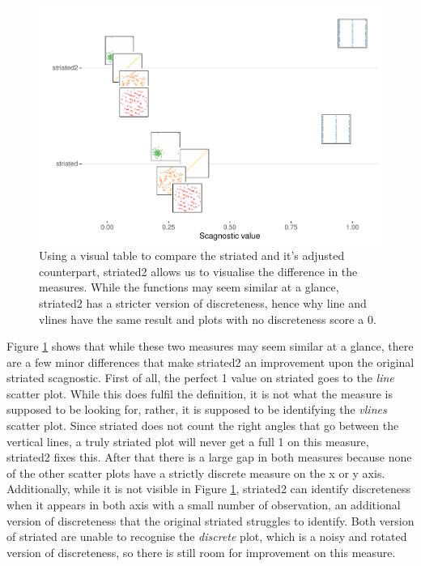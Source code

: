 \begin{Schunk}
\begin{figure}
\includegraphics[width=1\linewidth]{mason-lee-laa-cook_files/figure-latex/striated-vtable-1} \caption[Using a visual table to compare the striated and it's adjusted counterpart, striated2 allows us to visualise the difference in the measures]{Using a visual table to compare the striated and it's adjusted counterpart, striated2 allows us to visualise the difference in the measures. While the functions may seem similar at a glance, striated2 has a stricter version of discreteness, hence why line and vlines have the same result and plots with no discreteness score a 0.}\label{fig:striated-vtable}
\end{figure}
\end{Schunk}

Figure \ref{fig:striated-vtable} shows that while these two measures may
seem similar at a glance, there are a few minor differences that make
striated2 an improvement upon the original striated scagnostic. First of
all, the perfect 1 value on striated goes to the \emph{line} scatter
plot. While this does fulfil the definition, it is not what the measure
is supposed to be looking for, rather, it is supposed to be identifying
the \emph{vlines} scatter plot. Since striated does not count the right
angles that go between the vertical lines, a truly striated plot will
never get a full 1 on this measure, striated2 fixes this. After that
there is a large gap in both measures because none of the other scatter
plots have a strictly discrete measure on the x or y axis. Additionally,
while it is not visible in Figure \ref{fig:striated-vtable}, striated2
can identify discreteness when it appears in both axis with a small
number of observation, an additional version of discreteness that the
original striated struggles to identify. Both version of striated are
unable to recognise the \emph{discrete} plot, which is a noisy and
rotated version of discreteness, so there is still room for improvement
on this measure.

